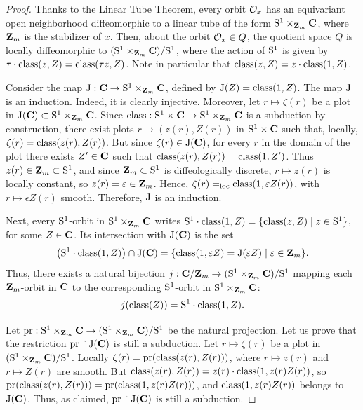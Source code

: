 \begin{proof}
  Thanks to the Linear Tube Theorem,
  every orbit $\mathcal{O}_x$ has an equivariant open neighborhood diffeomorphic to a linear tube of the form $\mathrm{S}^1 \times_{\mathbf{Z}_m} \mathbf{C}$,
  where $\mathbf{Z}_m$ is the stabilizer of $x$.
  Then,
  about the orbit $\mathcal{O}_x \in Q$,
  the quotient space $Q$ is locally diffeomorphic to $(\mathrm{S}^1 \times_{\mathbf{Z}_m} \mathbf{C})/\mathrm{S}^1$,
  where the action of $\mathrm{S}^1$ is given by $\tau \cdot \operatorname{class}(z,Z) = \operatorname{class}(\tau z, Z)$.
  Note in particular that $\operatorname{class}(z,Z) = z \cdot \operatorname{class}(1,Z)$.
  
  Consider the map $\operatorname{J} : \mathbf{C} \to \mathrm{S}^1 \times_{\mathbf{Z}_m} \mathbf{C}$,
  defined by $\operatorname{J}(Z) = \operatorname{class}(1,Z)$.
  The map $\operatorname{J}$ is an induction.
  Indeed,
  it is clearly injective.
  Moreover,
  let $r \mapsto \zeta(r)$ be a plot in $\operatorname{J}(\mathbf{C}) \subset \mathrm{S}^1 \times_{\mathbf{Z}_m} \mathbf{C}$.
  Since $\operatorname{class} : \mathrm{S}^1 \times \mathbf{C} \to \mathrm{S}^1 \times_{\mathbf{Z}_m} \mathbf{C}$ is a subduction by construction,
  there exist plots $r \mapsto (z(r), Z(r))$ in $\mathrm{S}^1 \times \mathbf{C}$ such that,
  locally,
  $\zeta(r) = \operatorname{class}(z(r), Z(r))$.
  But since $\zeta(r) \in \operatorname{J}(\mathbf{C})$,
  for every $r$ in the domain of the plot there exists $Z' \in \mathbf{C}$ such that $\operatorname{class}(z(r), Z(r)) = \operatorname{class}(1, Z')$.
  Thus $z(r) \in \mathbf{Z}_m \subset \mathrm{S}^1$,
  and since $\mathbf{Z}_m \subset \mathrm{S}^1$ is diffeologically discrete,
  $r \mapsto z(r)$ is locally constant,
  so $z(r) = \varepsilon \in \mathbf{Z}_m$.
  Hence,
  $\zeta(r) =_{\text{loc}} \operatorname{class}(1, \varepsilon Z(r))$,
  with $r \mapsto \epsilon Z(r)$ smooth.
  Therefore,
  $\operatorname{J}$ is an induction.
  
  Next,
  every $\mathrm{S}^1$-orbit in $\mathrm{S}^1 \times_{\mathbf{Z}_m} \mathbf{C}$ writes $\mathrm{S}^1 \cdot \operatorname{class}(1,Z) = \{\operatorname{class}(z,Z) \mid z \in \mathrm{S}^1\}$,
  for some $Z \in \mathbf{C}$.
  Its intersection with $\operatorname{J}(\mathbf{C})$ is the set
  $$%
    \big(\Sph^1 \cdot \Class(1,Z)\big) \cap \J(\CC) = \{\Class(1,\epsilon Z) = \J(\epsilon Z) \mid \epsilon \in \ZZ_m\}.
    $$%
  Thus,
  there exists a natural bijection $j : \mathbf{C}/\mathbf{Z}_m \to (\mathrm{S}^1 \times_{\mathbf{Z}_m} \mathbf{C})/\mathrm{S}^1$ mapping each $\mathbf{Z}_m$-orbit in $\mathbf{C}$ to the corresponding $\mathrm{S}^1$-orbit in $\mathrm{S}^1 \times_{\mathbf{Z}_m} \mathbf{C}$:
  $$%
    j(\Class(Z)) = \Sph^1 \cdot \Class(1,Z).
    $$%
  
  Let $\operatorname{pr} : \mathrm{S}^1 \times_{\mathbf{Z}_m} \mathbf{C} \to (\mathrm{S}^1 \times_{\mathbf{Z}_m} \mathbf{C})/\mathrm{S}^1$ be the natural projection.
  Let us prove that the restriction $\operatorname{pr} \restriction \operatorname{J}(\mathbf{C})$ is still a subduction.
  Let $r \mapsto \zeta(r)$ be a plot in $(\mathrm{S}^1 \times_{\mathbf{Z}_m} \mathbf{C})/\mathrm{S}^1$.
  Locally $\zeta(r) = \operatorname{pr}(\operatorname{class}(z(r), Z(r)))$,
  where $r \mapsto z(r)$ and $r \mapsto Z(r)$ are smooth.
  But $\operatorname{class}(z(r), Z(r)) = z(r) \cdot \operatorname{class}(1, z(r) Z(r))$,
  so $\operatorname{pr}(\operatorname{class}(z(r), Z(r))) = \operatorname{pr}(\operatorname{class}(1, z(r) Z(r)))$,
  and $\operatorname{class}(1, z(r) Z(r))$ belongs to $\operatorname{J}(\mathbf{C})$.
  Thus,
  as claimed,
  $\operatorname{pr} \restriction \operatorname{J}(\mathbf{C})$ is still a subduction.
  

\end{proof}
